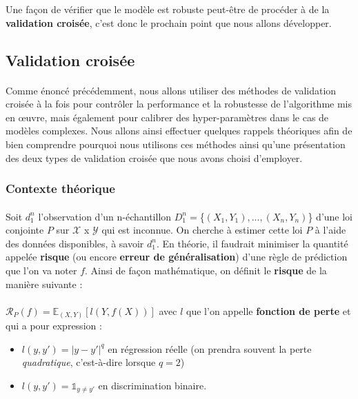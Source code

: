 \documentclass[14pt, openany]{article}
\begin{document}
Une façon de vérifier que le modèle est robuste peut-être de procéder à de la \textbf{validation croisée}, c'est donc le prochain point que nous allons développer.
 
\subsection{Validation croisée}
\paragraph{}
Comme énoncé précédemment, nous allons utiliser des méthodes de validation croisée à la fois pour contrôler la performance et la robustesse de l'algorithme mis en œuvre, mais également pour calibrer des hyper-paramètres dans le cas de modèles complexes. Nous allons ainsi effectuer quelques rappels théoriques afin de bien comprendre pourquoi nous utilisons ces méthodes ainsi qu'une présentation des deux types de validation croisée que nous avons choisi d'employer.

\subsubsection{Contexte théorique}
\paragraph{}
Soit $d^{n}_{1}$ l'observation d'un n-échantillon $D^{n}_{1} =$\{$(X_1,Y_1),...,(X_n,Y_n)$\} d'une loi conjointe $P$ sur $\mathcal{X}$ x $\mathcal{Y}$ qui est inconnue. On cherche à estimer cette loi $P$ à l'aide des données disponibles, à savoir $d^{n}_{1}$. En théorie, il faudrait minimiser la quantité appelée \textbf{risque} (ou encore \textbf{erreur de généralisation}) d'une règle de prédiction que l'on va noter $f$. Ainsi de façon mathématique, on définit le \textbf{risque} de la manière suivante :
\paragraph{}
$\mathcal{R}_P(f) = \mathbb{E}_{(X,Y)}[l(Y,f(X))]$ avec $l$ que l'on appelle \textbf{fonction de perte} et qui a pour expression :
\begin{itemize}
\item $l(y,y') = |y-y'|^q$ en régression réelle (on prendra souvent la perte \textit{quadratique}, c'est-à-dire lorsque $q=2$)
\item $l(y,y') = \mathds{1}_{y \neq y'}$ en discrimination binaire.
\end{itemize}
\end{document}
